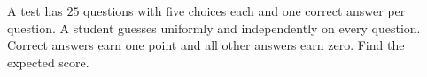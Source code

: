 A test has $25$ questions with five choices each and one correct answer per question. A student guesses uniformly and independently on every question. Correct answers earn one point and all other answers earn zero. Find the expected score.
